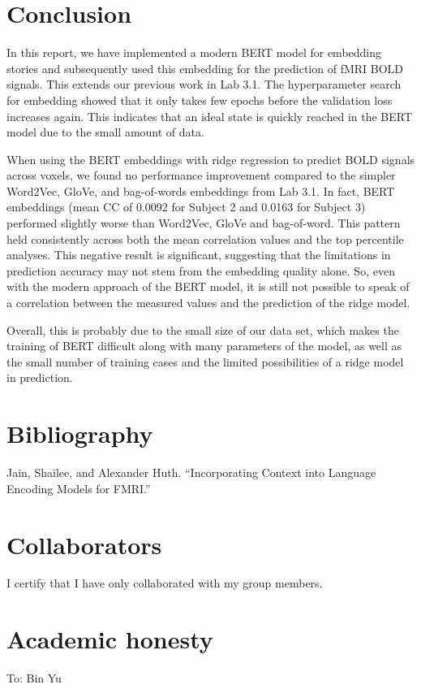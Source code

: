 \documentclass[12pt,letterpaper]{article}
\begin{document}
\section{Conclusion}
In this report, we have implemented a modern BERT model for embedding stories and subsequently used this embedding for the prediction of fMRI BOLD signals. This extends our previous work in Lab 3.1. The hyperparameter search for embedding showed that it only takes few epochs before the validation loss increases again. This indicates that an ideal state is quickly reached in the BERT model due to the small amount of data. 

When using the BERT embeddings with ridge regression to predict BOLD signals across voxels, we found no performance improvement compared to the simpler Word2Vec, GloVe, and bag-of-words embeddings from Lab 3.1. In fact, BERT embeddings (mean CC of 0.0092 for Subject 2 and 0.0163 for Subject 3) performed slightly worse than Word2Vec, GloVe and bag-of-word. This pattern held consistently across both the mean correlation values and the top percentile analyses. This negative result is significant, suggesting that the limitations in prediction accuracy may not stem from the embedding quality alone. So, even with the modern approach of the BERT model, it is still not possible to speak of a correlation between the measured values and the prediction of the ridge model.

Overall, this is probably due to the small size of our data set, which makes the training of BERT difficult along with many parameters of the model, as well as the small number of training cases and the limited possibilities of a ridge model in prediction.

\section{Bibliography}

Jain, Shailee, and Alexander Huth. “Incorporating Context into Language Encoding Models for FMRI.” 

\section{Collaborators} 

I certify that I have only collaborated with my group members. 


\section{Academic honesty}
To: Bin Yu 
\end{document}
